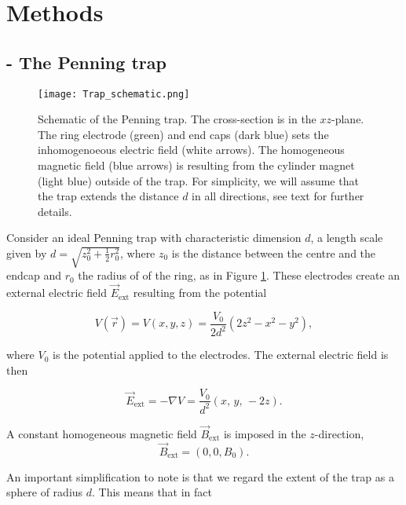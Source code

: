 \section{Methods}\label{sec:methods}


\subsection{ - The Penning trap}



\begin{figure}[h!]
    \texttt{[image: Trap\_schematic.png]}
    \caption{Schematic of the Penning trap. The cross-section is in the $xz$-plane. The ring electrode (green) and end caps (dark blue) sets the inhomogenoeous electric field (white arrows). The homogeneous magnetic field (blue arrows) is resulting from the cylinder magnet (light blue) outside of the trap. For simplicity, we will assume that the trap extends the distance $d$ in all directions, see text for further details.}
    \label{fig:schematic_trap}
\end{figure}

Consider an ideal Penning trap with characteristic dimension $d$, a length scale given by $d= \sqrt{z_0^2+ \frac{1}{2}r_0^2}$, where $z_0$ is the distance between the centre and the endcap and $r_0$ the radius of of the ring, as in Figure \ref{fig:schematic_trap}. These electrodes create an external electric field $\vec{E}_\mathrm{ext}$ resulting from the potential

\begin{equation}
    V (\vec{r})= V(x,y,z) = \frac{V_0}{2d^2}(2z^2 - x^2 - y^2), \label{eq:penning_potential}
\end{equation}

where $V_0$ is the potential applied to the electrodes. The external electric field is then 

\begin{equation}
    \vec{E}_\mathrm{ext} = -\nabla V = \frac{V_0}{d^2} (x,\,y,\,-2z). \label{eq:p1_E_field_pot_gradient}
\end{equation}

A constant homogeneous magnetic field $\vec{B}_\mathrm{ext}$ is imposed in the $z$-direction,
\begin{equation}
    \vec{B}_\mathrm{ext} = (0,0,B_0). \label{eq:homogeneous_B_field}
\end{equation}

An important simplification to note is that we regard the extent of the trap as a sphere of radius $d$. This means that in fact

